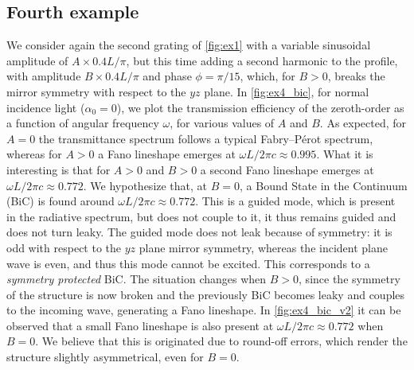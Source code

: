\documentclass[reprint,amsmath,amssymb,
 aps]{revtex4-2}
\begin{document}
\subsection{Fourth example}
We consider again the second grating of \cref{fig:ex1} with a variable sinusoidal amplitude of $A\times 0.4L/\pi$, but this time adding a second harmonic to the profile, with amplitude $B\times 0.4L/\pi$ and phase $\phi = \pi/15$, which, for $B > 0$, breaks the mirror symmetry with respect to the $yz$ plane. In \cref{fig:ex4_bic}, for normal incidence light ($\alpha_0 = 0$), we plot the transmission efficiency of the zeroth-order as a function of angular frequency $\omega$, for various values of $A$ and $B$. As expected, for $A=0$ the transmittance spectrum follows a typical Fabry–Pérot spectrum, whereas for $A>0$ a Fano lineshape emerges at $\omega L /2\pi c \approx 0.995.$ What it is interesting is that for $A > 0$ and $B>0$ a second Fano lineshape emerges at $\omega L /2\pi c \approx 0.772$. We hypothesize that, at $B=0$, a Bound State in the Continuum (BiC) \cite{hsu2016bound} is found around $\omega L /2\pi c \approx 0.772$. This is a guided mode, which is present in the radiative spectrum, but does not couple to it, it thus remains guided and does not turn leaky. The guided mode does not leak because of symmetry: it is odd with respect to the $yz$ plane mirror symmetry, whereas the incident plane wave is even, and thus this mode cannot be excited. This corresponds to a \textit{symmetry protected} BiC. The situation changes when $B > 0$, since the symmetry of the structure is now broken and the previously BiC becomes leaky and couples to the incoming wave, generating a Fano lineshape. In \cref{fig:ex4_bic_v2} it can be observed that a small Fano lineshape is also present at $\omega L /2\pi c \approx 0.772$ when $B=0$. We believe that this is originated due to round-off errors, which render the structure slightly asymmetrical, even for $B=0$.
\end{document}
